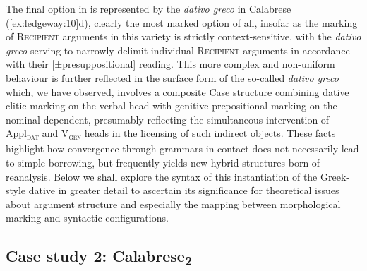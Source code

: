 \documentclass[output=paper,modfonts,nonflat,colorlinks,citecolor=brown]{langsci/langscibook}
\begin{document}
The final option in  is represented by the \textit{dativo greco} in Calabrese (\ref{ex:ledgeway:10}d), clearly the most marked option of all, insofar as the marking of \textsc{Recipient} arguments in this variety is strictly context-sensitive, with the \textit{dativo greco} serving to narrowly delimit individual \textsc{Recipient} arguments in accordance with their [±presuppositional] reading. This more complex and non-uniform behaviour is further reflected in the surface form of the so-called \textit{dativo greco} which, we have observed, involves a composite Case structure combining dative clitic marking on the verbal head with genitive prepositional marking on the nominal dependent, presumably reflecting the simultaneous intervention of Appl\textsc{\textsubscript{dat}} and V\textsc{\textsubscript{gen}} heads in the licensing of such indirect objects. These facts highlight how convergence through grammars in contact does not necessarily lead to simple borrowing, but frequently yields new hybrid structures born of reanalysis. Below we shall explore the syntax of this instantiation of the Greek-style dative in greater detail to ascertain its significance for theoretical issues about argument structure and especially the mapping between morphological marking and syntactic configurations.
 

 
\subsection{Case study 2: Calabrese\textsubscript{2}}
\end{document}

